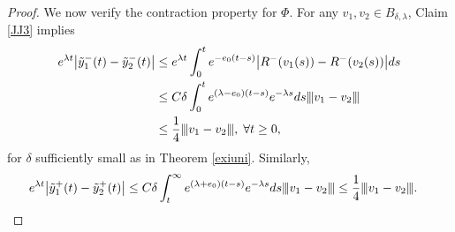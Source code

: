 \documentclass[10pt,a4paper]{amsart}
\newcommand{\vertiii}[1]{{\left\vert\kern-0.25ex\left\vert\kern-0.25ex\left\vert #1 
    \right\vert\kern-0.25ex\right\vert\kern-0.25ex\right\vert}}
\begin{document}
\begin{proof}
We now verify the contraction property for $\Phi$. For any $v_1, v_2\in B_{\delta, \lambda}$, Claim \ref{JJ3} implies 
\begin{align*}
	e^{\lambda t}\bigl|\tilde y_1^-(t)-\tilde y_2^-(t)\bigr| &\le  e^{\lambda t}
	  \int_0^t e^{-e_0(t-s)}\bigl |R^-(v_1(s))-R^-(v_2(s))\bigr|ds \\
	&\le C\delta \int_0^t e^{(\lambda- e_0)(t-s)} e^{-\lambda s}ds \vertiii{v_1-v_2}\\
	&\le \frac 14\vertiii{v_1-v_2}, \; \forall t\ge0,
\end{align*}
for $\delta$ sufficiently small as in Theorem \ref{exiuni}. Similarly, 
\begin{align}
		e^{\lambda t}\bigl |\tilde y_1^+(t)-\tilde y_2^+(t)\bigr |&\le C\delta\int_t^{\infty}e^{(\lambda+e_0)(t-s)}e^{-\lambda s}ds\vertiii{v_1-v_2}\le \frac 14\vertiii{v_1-v_2}. \label{1009}
\end{align}


\end{proof}
\end{document}

